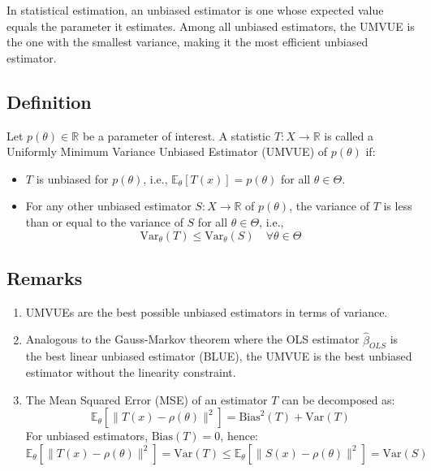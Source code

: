 \documentclass[open=any, 11pt,paper=A4]{scrreprt}
\begin{document}
In statistical estimation, an unbiased estimator is one whose expected value equals the parameter it estimates. Among all unbiased estimators, the UMVUE is the one with the smallest variance, making it the most efficient unbiased estimator.

\subsection{Definition}

\begin{definition}[UMVUE]
Let $p(\theta) \in \mathbb{R}$ be a parameter of interest. A statistic $T: X \to \mathbb{R}$ is called a Uniformly Minimum Variance Unbiased Estimator (UMVUE) of $p(\theta)$ if:
\begin{itemize}
    \item $T$ is unbiased for $p(\theta)$, i.e., $\mathbb{E}_\theta[T(x)] = p(\theta)$ for all $\theta \in \Theta$.
    \item For any other unbiased estimator $S: X \to \mathbb{R}$ of $p(\theta)$, the variance of $T$ is less than or equal to the variance of $S$ for all $\theta \in \Theta$, i.e.,
    \[
    \text{Var}_\theta(T) \leq \text{Var}_\theta(S) \quad \forall \theta \in \Theta
    \]
\end{itemize}
\end{definition}

\subsection{Remarks}

\begin{enumerate}
    \item UMVUEs are the best possible unbiased estimators in terms of variance.
    
    \item Analogous to the Gauss-Markov theorem where the OLS estimator $\hat{\beta}_{OLS}$ is the best linear unbiased estimator (BLUE), the UMVUE is the best unbiased estimator without the linearity constraint.
    
    \item The Mean Squared Error (MSE) of an estimator $T$ can be decomposed as:
    \[
    \mathbb{E}_\theta \left[ \| T(x) - \rho(\theta) \|^2 \right] = \text{Bias}^2(T) + \text{Var}(T)
    \]
    For unbiased estimators, $\text{Bias}(T) = 0$, hence:
    \[
    \mathbb{E}_\theta \left[ \| T(x) - \rho(\theta) \|^2 \right] = \text{Var}(T) \leq \mathbb{E}_\theta \left[ \| S(x) - \rho(\theta) \|^2 \right] = \text{Var}(S)
    \]
\end{enumerate}
\end{document}
